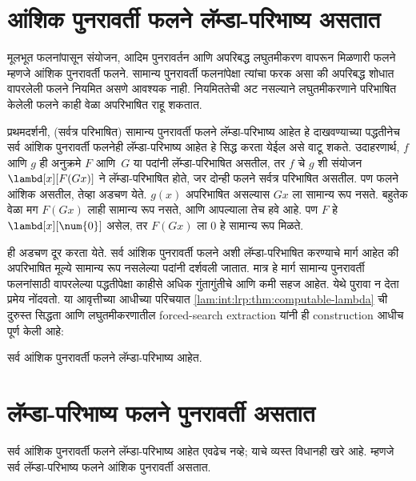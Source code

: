 \section{आंशिक पुनरावर्ती फलने लॅम्डा-परिभाष्य असतात}\label{lam:ldf:par:sec}

मूलभूत फलनांपासून संयोजन, आदिम पुनरावर्तन आणि
अपरिबद्ध लघुतमीकरण वापरून मिळणारी फलने म्हणजे
आंशिक पुनरावर्ती फलने. सामान्य पुनरावर्ती फलनांपेक्षा
त्यांचा फरक असा की अपरिबद्ध शोधात वापरलेली फलने
नियमित असणे आवश्यक नाही. नियमिततेची अट नसल्याने
लघुतमीकरणाने परिभाषित केलेली फलने काही वेळा
अपरिभाषित राहू शकतात.

प्रथमदर्शनी, (सर्वत्र परिभाषित) सामान्य पुनरावर्ती
फलने लॅम्डा-परिभाष्य आहेत हे दाखवण्याच्या
पद्धतीनेच सर्व आंशिक पुनरावर्ती फलनेही
लॅम्डा-परिभाष्य आहेत हे सिद्ध करता येईल असे
वाटू शकते. उदाहरणार्थ, $f$ आणि $g$ ही अनुक्रमे
$F$ आणि~$G$ या पदांनी लॅम्डा-परिभाषित
असतील, तर $f$ चे $g$ शी संयोजन
$\lambd[x][F (G x)]$ ने लॅम्डा-परिभाषित होते,
जर दोन्ही फलने सर्वत्र परिभाषित असतील.
पण फलने आंशिक असतील, तेव्हा अडचण येते.
$g(x)$ अपरिभाषित असल्यास $G x$ ला सामान्य रूप
नसते. बहुतेक वेळा मग $F (G x)$ लाही सामान्य रूप
नसते, आणि आपल्याला तेच हवे आहे. पण
$F$ हे $\lambd[x][\num{0}]$ असेल, तर
$F (G x)$ ला $\num{0}$ हे सामान्य रूप मिळते.

ही अडचण दूर करता येते. सर्व आंशिक पुनरावर्ती
फलने अशी लॅम्डा-परिभाषित करण्याचे मार्ग आहेत
की अपरिभाषित मूल्ये सामान्य रूप नसलेल्या पदांनी
दर्शवली जातात. मात्र हे मार्ग सामान्य पुनरावर्ती
फलनांसाठी वापरलेल्या पद्धतीपेक्षा काहीसे अधिक
गुंतागुंतीचे आणि कमी सहज आहेत. येथे पुरावा न देता
प्रमेय नोंदवतो. या आवृत्तीच्या आधीच्या परिचयात
\ref{lam:int:lrp:thm:computable-lambda} ची दुरुस्त
सिद्धता आणि लघुतमीकरणातील forced-search extraction
यांनी ही construction आधीच पूर्ण केली आहे:

\begin{thm}
  सर्व आंशिक पुनरावर्ती फलने लॅम्डा-परिभाष्य आहेत.
\end{thm}











\section{लॅम्डा-परिभाष्य फलने पुनरावर्ती असतात}\label{lam:dfl:ldr:sec}

सर्व आंशिक पुनरावर्ती फलने लॅम्डा-परिभाष्य
आहेत एवढेच नव्हे; याचे व्यस्त विधानही खरे आहे.
म्हणजे सर्व लॅम्डा-परिभाष्य फलने आंशिक
पुनरावर्ती असतात.

